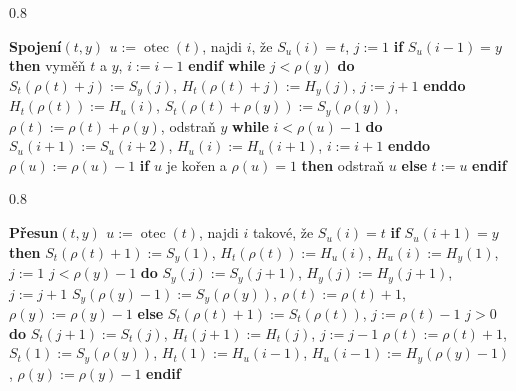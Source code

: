 \documentclass[a4paper,12pt]{article}
\DeclareMathOperator*{\otec}{otec}
\newcommand{\algoritmus}[1]{
  {
  \setlength\fboxrule{0.5pt}

  \begin{boxedminipage}{0.8\textwidth}

 #1
  \end{boxedminipage}

  }
  }
\begin{document}
\algoritmus{
{\bf Spojení$(t,y)$\newline 
$u:=\otec(t)$}, najdi $i$, že $S_u(i)=t$, $j:=1$\newline 
{\bf \textsf{if}} $S_u(i-1)=y$ {\bf \textsf{then}} vyměň $t$ a $y$, $i:=i-1$ {\bf \textsf{endif}\newline 
\textsf{while}} $j<\rho (y)$ {\bf \textsf{do}}\newline 
\phantom{---}$S_t(\rho (t)+j):=S_y(j)$, $H_t(\rho (t)+j):=H_y(j)$, $j:=j+1$\newline 
{\bf \textsf{enddo}}\newline 
$H_t(\rho (t)):=H_u(i)$, $S_t(\rho (t)+\rho (y)):=S_y(\rho (y))$, $
\rho (t):=\rho (t)+\rho (y)$, odstraň $y$\newline 
{\bf \textsf{while}} $i<\rho (u)-1$ {\bf \textsf{do}}\newline 
\phantom{---}$S_u(i+1):=S_u(i+2)$, $H_u(i):=H_u(i+1)$, $i:=i+1$\newline 
{\bf \textsf{enddo}}\newline 
$\rho (u):=\rho (u)-1$\newline 
{\bf \textsf{if}} $u$ je kořen a $\rho (u)=1$ {\bf \textsf{then}}\newline 
\phantom{---}odstraň $u$\newline 
{\bf \textsf{else}}\newline 
\phantom{---}$t:=u$\newline 
{\bf \textsf{endif}}}
\algoritmus{
{\bf Přesun$(t,y)$\newline 
$u:=\otec(t)$}, najdi $i$ takové, že $S_u(i)=t$\newline 
{\bf \textsf{if}} $S_u(i+1)=y$ {\bf \textsf{then}}\newline 
\phantom{---}$S_t(\rho (t)+1):=S_y(1)$, $H_t(\rho (t)):=H_u(i)$,\newline 
\phantom{---}$H_u(i):=H_y(1)$, $j:=1$\newline 
\phantom{---}{\bf \textsf{while}} $j<\rho (y)-1$ {\bf \textsf{do}}\newline 
\phantom{------}$S_y(j):=S_y(j+1)$, $H_y(j):=H_y(j+1)$, $j:=j+1$\newline 
\phantom{---}{\bf \textsf{enddo}}\newline 
\phantom{---}$S_y(\rho (y)-1):=S_y(\rho (y))$, $\rho (t):=\rho (t)+1$, $\rho 
(y):=\rho (y)-1$\newline 
{\bf \textsf{else}}\newline
\phantom{---}$S_t(\rho (t)+1):=S_t(\rho (t))$, $j:=\rho (t)-1$\newline 
\phantom{---}{\bf \textsf{while}} $j>0$ {\bf \textsf{do}}\newline 
\phantom{------}$S_t(j+1):=S_t(j)$, $H_t(j+1):=H_t(j)$, $j:=j-1$\newline 
\phantom{---}{\bf \textsf{enddo}}\newline 
\phantom{---}$\rho (t):=\rho (t)+1$, $S_t(1):=S_y(\rho (y))$, $H_t(1):=H_u(i-
1)$,\newline 
\phantom{---}$H_u(i-1):=H_y(\rho (y)-1)$, $\rho (y):=\rho (y)-1$\newline 
{\bf \textsf{endif}}
}
\end{document}
